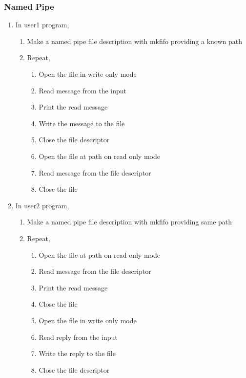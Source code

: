 \subsubsection{Named Pipe}
\begin{enumerate}
  \item In user1 program,
  \begin{enumerate}
    \item Make a named pipe file description with mkfifo providing a known path
    \item Repeat,
    \begin{enumerate}
      \item Open the file in write only mode
      \item Read message from the input
      \item Print the read message
      \item Write the message to the file
      \item Close the file descriptor
      \item Open the file at path on read only mode
      \item Read message from the file descriptor 
      \item Close the file
    \end{enumerate}
  \end{enumerate}
  \item In user2 program,
  \begin{enumerate}
    \item Make a named pipe file description with mkfifo providing same path
    \item Repeat,
    \begin{enumerate}
      \item Open the file at path on read only mode
      \item Read message from the file descriptor 
      \item Print the read message
      \item Close the file
      \item Open the file in write only mode
      \item Read reply from the input
      \item Write the reply to the file
      \item Close the file descriptor
    \end{enumerate}
   
  \end{enumerate}
\end{enumerate}

